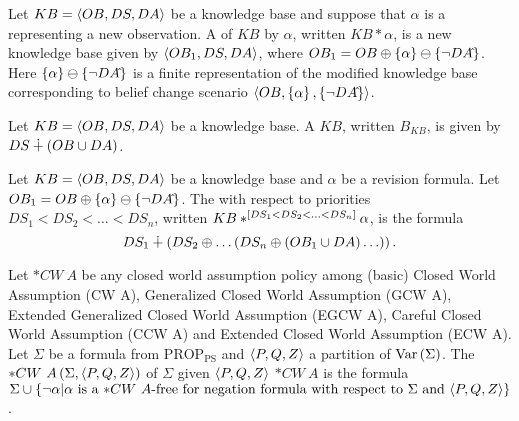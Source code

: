 \begin{defi}
Let $KB=\left\langle OB,DS,DA\right\rangle$ be a knowledge base and suppose that $\alpha$ is a  representing a new observation. A  of $KB$ by $\alpha$, written $KB\ast\alpha$, is a new knowledge base given by $\left\langle OB_1,DS,DA\right\rangle$, where $OB_1=OB\oplus\left\{ \alpha\right\}\ominus\left\{ \neg DA\hat{}\right\}$. Here $\left\{ \alpha\right\}\ominus\left\{ \neg DA\hat{}\right\}$ is a finite representation of the modified knowledge base corresponding to belief change scenario $\left\langle OB,\left\{ \alpha\right\},\left\{ \neg DA\hat{}\right\}\right\rangle$.
\cite{conf/fedcsis/KorpusikLM12}
\end{defi}

\begin{defi}
Let $KB=\left\langle OB,DS,DA\right\rangle$ be a knowledge base. A  $KB$, written $B_{KB}$, is given
by $DS\dotplus\left( OB\cup DA\right)$.
\cite{conf/fedcsis/KorpusikLM12}
\end{defi}

\begin{defi}
Let $KB=\left\langle OB,DS,DA\right\rangle$ be a knowledge base and $\alpha$ be a revision formula. Let $OB_1=OB\oplus\left\{ \alpha\right\}\ominus\left\{ \neg DA\hat{}\right\}$. The  with respect to priorities $DS_1<DS_2<\ldots<DS_n$, written $KB\ast^{\left[ DS_1<DS_2<\ldots<DS_n\right]}\alpha$, is the formula
\begin{equation}
DS_1\dotplus\left( DS_2\oplus\ldots\left( DS_n\oplus (OB_1\cup DA)\ldots\right)\right).
\end{equation}
\cite{}
\end{defi}

\begin{defi}
Let $*CW\ A$ be any closed world assumption policy among (basic) Closed World Assumption (CW A), Generalized Closed World Assumption (GCW A), Extended Generalized Closed World Assumption (EGCW A), Careful Closed World Assumption (CCW A) and Extended Closed World Assumption (ECW A). Let $\Sigma$ be a formula from $\mbox{PROP}_{\mbox{PS}}$ and $\left\langle P,Q,Z\right\rangle$ a partition of $\mbox{Var}\left(\Sigma\right)$. The  $*CW\ A\left(\Sigma,\left\langle P,Q,Z\right\rangle\right)$ of $\Sigma$ given $\left\langle P,Q,Z\right\rangle$ \wrtTx{} $*CW\ A$ is the formula $\Sigma\cup\accol{\neg\alpha|\alpha\mbox{ is a $*CW\ A$-free for negation formula \wrtTx{} $\Sigma$ and $\tuple{P,Q,Z}$}}$.
\cite{conf/ijcai/Coste-MarquisM99}
\end{defi}

